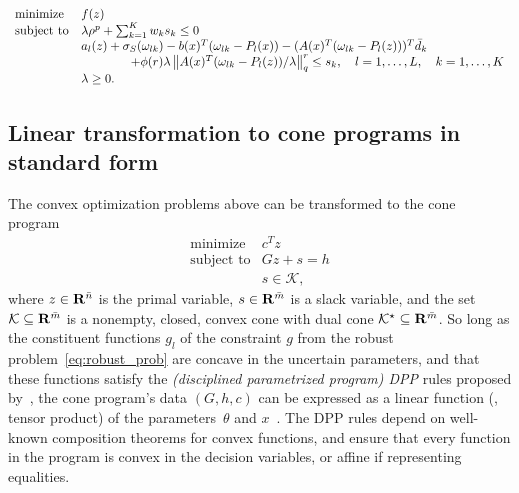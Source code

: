 \documentclass[11pt]{article}
\newcommand{\bsnote}[1]{\noindent\textcolor{red}{\texttt{Bartolomeo: #1}}}
\newcommand{\RC}[1]{\textcolor{black}{#1}}
\begin{document}
\begin{appendices}
\begin{equation}
	\label{eq:mro_max}
	\begin{aligned}
		\begin{array}{ll}
			\text{minimize } & f(z)\\
			\mbox{subject to} & \lambda\rho^p  + \sum_{k=1}^{K} w_{k} s_{k}  \le 0\\
			& a_l(z) + \sigma_S(\omega_{lk}) - b\RC{(x)}^T(\omega_{lk} - P_l(x)) - (A\RC{(x)}^T(\omega_{lk} - P_l(z)))^T\bar{d}_k \\
   &\qquad \qquad + \phi(r)\lambda \left\|A\RC{(x)}^T(\omega_{lk} - P_l(z))/\lambda \right\|^r_q \leq s_k, \quad l = 1,\dots, L, \quad k = 1,\dots, K\\
			& \lambda \geq 0.
		\end{array}
	\end{aligned}
\end{equation}

\subsection{Linear transformation to cone programs in standard form}
\label{sec:dpp}
The convex optimization problems above can be transformed to the cone program~\citep{cvxpylayers2019}
	\begin{equation}
 \label{eq:conic}
		\begin{array}{ll}
			\mbox{minimize} & c^Tz\\
			\mbox{subject to} & Gz+ s = h \\
			& s \in \mathcal{K},
		\end{array}
	\end{equation}
where $z \in {\mathbf R}^{\bar{n}}$ is the primal variable, $s \in {\mathbf R}^{\bar{m}}$ is a slack variable, and the set $\mathcal{K} \subseteq {\mathbf R}^{\bar{m}}$ is a nonempty, closed, convex cone with dual cone $\mathcal{K}^\star \subseteq {\mathbf R}^{\bar{m}}$.  So long as  the constituent functions $g_l$ of the constraint $g$ from the robust problem~\eqref{eq:robust_prob}
are concave in the uncertain parameters, and that these functions satisfy the {\it (disciplined parametrized program) DPP} rules proposed by~\cite{cvxpylayers2019}, the cone program's data $(G,h,c)$ can be expressed as a linear function (\ie, tensor product) of the parameters~$\theta$ and $x$~\citep[Lemma 1]{cvxpylayers2019}. 
The DPP rules depend on well-known composition theorems for convex functions, and ensure that every function in the program is convex in the decision variables, or affine if representing equalities.


\end{appendices}
\end{document}
